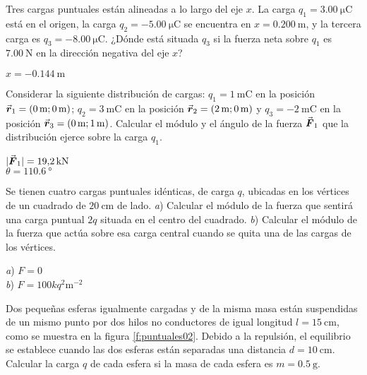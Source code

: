 %
\begin{Exercise}
  Tres cargas puntuales están alineadas a lo largo del eje $x$. La carga $q_1 = \SI{3.00}{\micro\coulomb}$ está en el origen, la carga $q_2 = \SI{-5.00}{\micro\coulomb}$ se encuentra en $x = \SI{0.200}{\metre}$, y la tercera carga es $q_3 = \SI{-8.00}{\micro\coulomb}$. ¿Dónde está situada $q_3$ si la fuerza neta sobre $q_1$ es $\SI{7.00}{\newton}$ en la dirección negativa del eje $x$?
\end{Exercise}
\begin{Answer}
  $x = \SI{-0.144}{\metre}$
\end{Answer}
%
\begin{Exercise}
  Considerar la siguiente distribución de cargas: $q_1 = \SI{1}{\milli\coulomb}$ en la posición $\va*{r}_1 = (\SI{0}{\metre};\SI{0}{\metre})$; $q_2 = \SI{3}{\milli\coulomb}$ en la posición $\va*{r}_2 = (\SI{2}{\metre};\SI{0}{\metre})$ y $q_3 = \SI{-2}{\milli\coulomb}$ en la posición $\va*{r}_3 = (\SI{0}{\metre};\SI{1}{\metre})$. Calcular el módulo y el ángulo de la fuerza $\va*{F}_1$ que la distribución ejerce sobre la carga $q_1$.
\end{Exercise}
\begin{Answer}
  \begin{minipage}[t]{.5\textwidth}
    $|\va*{F}_1| = \SI{19.2}{\kilo\newton}$\\ $\theta = \SI{110.6}{\degree}$
  \end{minipage}
\end{Answer}
%
\begin{Exercise}
  Se tienen cuatro cargas puntuales idénticas, de carga $q$, ubicadas en los vértices de un cuadrado de $\SI{20}{\centi\metre}$ de lado. \textit{a}) Calcular el módulo de la fuerza que sentirá una carga puntual $2q$ situada en el centro del cuadrado. \textit{b}) Calcular el módulo de la fuerza que actúa sobre esa carga central cuando se quita una de las cargas de los vértices.
\end{Exercise}
\begin{Answer}
  \begin{minipage}[t]{.5\textwidth}
    \textit{a}) $F = 0$\\ \textit{b}) $F = 100kq^2\si{\metre^{-2}}$
  \end{minipage}
\end{Answer}
%
\begin{Exercise}\label{p:puntuales02}
  Dos pequeñas esferas igualmente cargadas y de la misma masa están suspendidas de un mismo punto por dos hilos no conductores de igual longitud $l = \SI{15}{\centi\metre}$, como se muestra en la figura \ref{f:puntuales02}. Debido a la repulsión, el equilibrio se establece cuando las dos esferas están separadas una distancia $d = \SI{10}{\centi\metre}$. Calcular la carga $q$ de cada esfera si la masa de cada esfera es $m = \SI{0.5}{\gram}$.
\end{Exercise}
